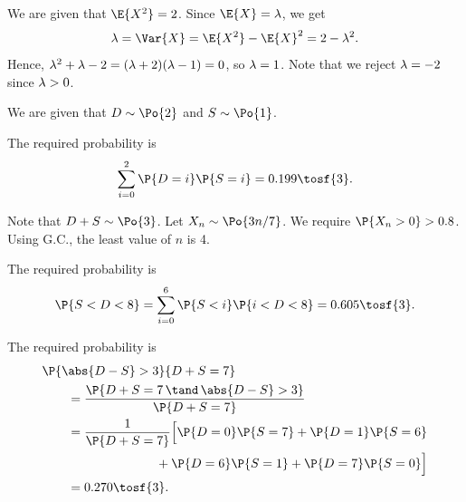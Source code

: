 \begin{solution}
    \begin{ppart}
        We are given that $\E{X^2} = 2$. Since $\E{X} = \l$, we get \[\l = \Var{X} = \E{X^2} - \E{X}^2 = 2 - \l^2.\] Hence, $\lambda^2 + \lambda - 2 = (\lambda+2)(\lambda-1) = 0$, so $\lambda = 1$. Note that we reject $\lambda = -2$ since $\lambda > 0$.
    \end{ppart}
    \begin{ppart}
        We are given that $D \sim \Po{2}$ and $S \sim \Po{1}$.

        \begin{psubpart}
            The required probability is \[\sum_{i = 0}^2 \P{D = i} \P{S = i} = 0.199 \tosf{3}.\]
        \end{psubpart}
        \begin{psubpart}
            Note that $D + S \sim \Po{3}$. Let $X_n \sim \Po{3n/7}$. We require $\P{X_n > 0} > 0.8$. Using G.C., the least value of $n$ is 4.
        \end{psubpart}
        \begin{psubpart}
            The required probability is \[\P{S < D < 8} = \sum_{i = 0}^6 \P{S < i} \P{i < D < 8} = 0.605 \tosf{3}.\]
        \end{psubpart}
        \begin{psubpart}
            The required probability is
            \begin{align*}
                &\P{\abs{D - S} > 3}{D + S = 7}\\
                &\hspace{2em}= \frac{\P{D + S = 7 \, \tand \, \abs{D - S} > 3}}{\P{D + S = 7}}\\
                &\hspace{2em}= \frac{1}{\P{D + S = 7}} \Big[\P{D = 0} \P{S = 7} + \P{D = 1}\P{S = 6}\\
                &\hspace{9em} + \P{D = 6} \P{S = 1} + \P{D = 7} \P{S = 0}\Big]\\
                &\hspace{2em}= 0.270 \tosf{3}.
            \end{align*}
        \end{psubpart}
    \end{ppart}
\end{solution}

